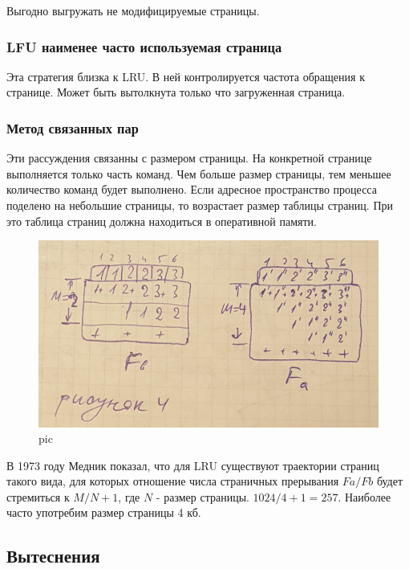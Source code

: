 Выгодно выгружать не модифицируемые страницы.

\subsubsection{LFU наименее часто используемая страница}

Эта стратегия близка к LRU. В ней контролируется частота обращения к странице. Может быть вытолкнута только что загруженная страница. 

\subsubsection{Метод связанных пар}

Эти рассуждения связанны с размером страницы. На конкретной странице выполняется только часть команд. Чем больше размер страницы, тем меньшее количество команд будет выполнено.  Если адресное пространство процесса поделено на небольшие страницы, то возрастает размер таблицы страниц. При это таблица страниц должна находиться в оперативной памяти. 

\begin{figure}[H]
    \centering
    \includegraphics[width=\textwidth]{pic/11.png}
    \caption{pic}
\end{figure}

В 1973 году Медник показал, что для LRU существуют траектории страниц такого вида, для которых отношение числа страничных прерывания $Fa / Fb$ будет стремиться к $M/N + 1$, где $N$ - размер страницы. $1024 / 4  + 1 = 257$. 
Наиболее часто употребим размер страницы 4 кб.

\subsection{Вытеснения}

